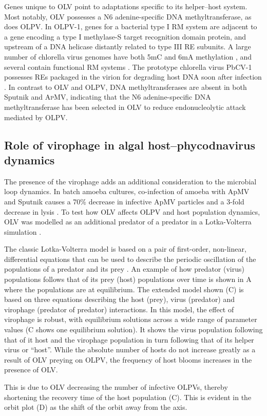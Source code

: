 Genes unique to \ac{OLV} point to adaptations specific to its helper--host system. 
Most notably, \ac{OLV} possesses a N6 adenine-specific \textsc{DNA} methyltransferase, as does \ac{OLPV}. 
In \ac{OLPV}-1, genes for a bacterial type I \ac{RM} system are adjacent to a gene encoding a type I methylase-S target recognition domain protein, and upstream of a \textsc{DNA} helicase distantly related to type III \ac{RE} subunits. 
A large number of chlorella virus genomes have both 5mC and 6mA methylation \cite{VanEtten1991}, and several contain functional \ac{RM} systems \cite{Nelson1993}. 
The prototype chlorella virus PbCV-1 possesses REs packaged in the virion for degrading host \textsc{DNA} soon after infection \cite{Agarkova2006}. 
In contrast to \ac{OLV} and \ac{OLPV}, \textsc{DNA} methyltransferases are absent in both Sputnik and \textsc{ApMV}, indicating that the N6 adenine-specific \textsc{DNA} methyltransferase has been selected in \ac{OLV} to reduce endonucleolytic attack mediated by \ac{OLPV}. 

\subsection[Virophage in algal host--phycodnavirus dynamics]{Role of virophage in algal host--phycodnavirus dynamics}
The presence of the virophage adds an additional consideration to the microbial loop dynamics. 
In batch amoeba cultures, co-infection of amoeba with \ac{ApMV} and Sputnik causes a 70\% decrease in infective \ac{ApMV} particles and a 3-fold decrease in lysis \cite{LaScola2008}. 
To test how \ac{OLV} affects \ac{OLPV} and host population dynamics, \ac{OLV} was modelled as an additional predator of a predator in a Lotka-Volterra simulation .
 
The classic Lotka-Volterra model \cite{Lotka1910} is based on a pair of first-order, non-linear, differential equations that can be used to describe the periodic oscillation of the populations of a predator and its prey \cite{Volterra1926}. 
An example of how predator (virus) populations follows that of its prey (host) populations over time is shown in A where the populations are at equilibrium.
The extended model shown (C) is based on three equations describing the host (prey), virus (predator) and virophage (predator of predator) interactions. 
In this model, the effect of virophage is robust, with equilibrium solutions across a wide range of parameter values (C shows one equilibrium solution).
It shows the virus population following that of it host and the virophage population in turn following that of its helper virus or ``host''. While the absolute number of hosts do not increase greatly as a result of \ac{OLV} preying on \ac{OLPV}, the frequency of host blooms increases in the presence of \ac{OLV}. 

This is due to \ac{OLV} decreasing the number of infective \acp{OLPV}, thereby shortening the recovery time of the host population (C).
This is evident in the orbit plot (D) as the shift of the orbit away from the axis. 

